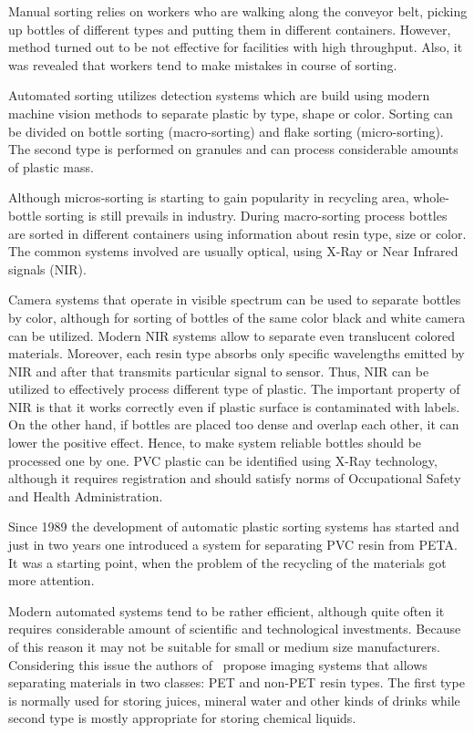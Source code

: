 \documentclass{lutmscthesis}[2010/09/22]
\begin{document}
Manual sorting relies on workers who are walking along the
conveyor belt, picking up bottles of different types and
putting them in different containers. However, method turned
out to be not effective for facilities with high throughput.
Also, it was revealed that workers tend to make mistakes
in course of sorting.

Automated sorting utilizes detection systems which are build
using modern machine vision methods to separate plastic by type,
shape or color. Sorting can be divided on bottle sorting (macro-sorting)
and flake sorting (micro-sorting). The second type is performed on granules
and can process considerable amounts of plastic mass.

Although micros-sorting is starting to gain
popularity in recycling area, whole-bottle sorting
is still prevails in industry. During macro-sorting
process bottles are sorted in different containers
using information about resin type, size or color.
The common systems involved are usually optical, using
X-Ray or Near Infrared signals (NIR).

Camera systems that operate in visible spectrum
can be used to separate bottles by color, although for
sorting of bottles of the same color black and white
camera can be utilized. Modern NIR systems
allow to separate even translucent colored materials.
Moreover, each resin type absorbs only specific wavelengths
emitted by NIR and after that transmits particular signal
to sensor. Thus, NIR can be utilized to effectively
process different type of plastic. The important property
of NIR is that it works correctly even if plastic surface
is contaminated with labels. On the other hand, if bottles
are placed too dense and overlap each other, it can lower
the positive effect. Hence, to make system reliable
bottles should be processed one by one. PVC plastic can
be identified using X-Ray technology, although it requires
registration and should satisfy norms of Occupational Safety
and Health Administration.

Since 1989 the development of automatic plastic sorting systems
has started and just in two years one introduced a system for separating
PVC resin from PETA. It was a starting point, when the problem
of the recycling of the materials got more attention.

Modern automated systems tend to be rather efficient, although
quite often it requires considerable amount of scientific and
technological investments. Because of this reason it may not
be suitable for small or medium size manufacturers. Considering this
issue the authors of~\cite{Wahab:2006} propose imaging systems
that allows separating materials in two classes: PET and non-PET
resin types. The first type is normally used for storing
juices, mineral water and other kinds of drinks while
second type is mostly appropriate for storing chemical
liquids.
\end{document}
